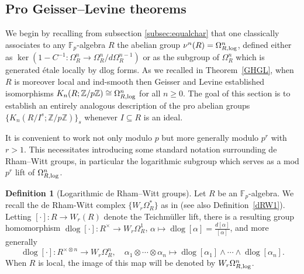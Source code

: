 \documentclass{amsart}
\theoremstyle{definition}
\newtheorem{definition}{Definition}[section]
\newcommand{\bb}{\mathbb}
\DeclareMathOperator{\dlog}{dlog}
\newcommand{\sub}[1]{{\mbox{\rm \scriptsize #1}}}
\newcommand{\al}{\alpha}
\begin{document}
\subsection{Pro Geisser--Levine theorems}
We begin by recalling from subsection \ref{subsec:equalchar} that one
classically associates to any $\bb F_p$-algebra $R$ the abelian group
$\nu^n(R)=\Omega^n_{R,\sub{log}}$, defined either as $\ker( 1 - C^{-1}:
\Omega^n_R \to \Omega^n_R / d \Omega^{n-1}_R)$ or as the subgroup of
$\Omega^n_R$ which is generated \'etale locally by dlog forms. As we recalled in Theorem~\ref{GHGL}, when $R$ is moreover local and ind-smooth then Geisser and Levine established isomorphisms $K_n(R;\bb Z/p\bb Z)\cong\Omega^n_{R,\sub{log}}$ for all $n\ge0$. The goal of this section is to establish an entirely analogous description of the pro abelian groups $\{K_n(R/I^s;\bb Z/p\bb Z)\}_s$ whenever $I\subseteq R$ is an ideal.




It is convenient to work not only modulo $p$ but more generally modulo $p^r$ with $r>1$. This necessitates introducing some standard notation surrounding de Rham--Witt groups, in particular the logarithmic subgroup which serves as a mod $p^r$ lift of $\Omega^n_{R,\sub{log}}$.

\begin{definition}[Logarithmic de Rham--Witt groups]\label{definition_dRW}
Let $R$ be an $\bb F_p$-algebra. 
We recall the de Rham-Witt complex $\{W_r \Omega_R^{\ast}\}$ as in
\cite{illusie-derham-witt} (see also 
Definition~\ref{dRW1}). 
Letting $[\cdot]:R\to W_r(R)$ denote the Teichm\"uller lift, there is a resulting group homomorphism $\dlog[\cdot]:R^\times\to W_r\Omega^1_R$, $\al\mapsto\dlog[\al]=\tfrac{d[\al]}{[\al]}$, and more generally \[\dlog[\cdot]:R^{\times\otimes n}\to W_r\Omega_{R}^n,\quad \al_1\otimes\cdots\otimes\al_n\mapsto\dlog[\al_1]\wedge\cdots\wedge\dlog[\al_n].\] When $R$ is local, the image of this map will be denoted by $W_r\Omega^n_{R,\sub{log}}$.
\end{definition}
\end{document}
